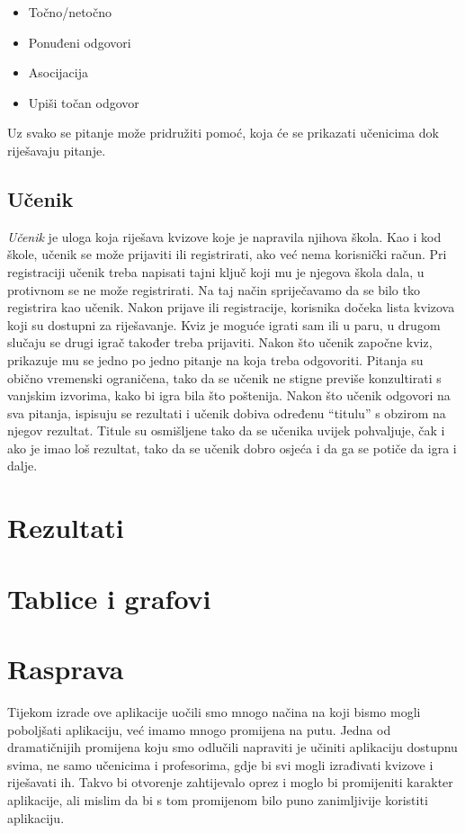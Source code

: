 \documentclass{scrreprt}
\begin{document}
\begin{itemize}
  \item Točno/netočno
  \item Ponuđeni odgovori
  \item Asocijacija
  \item Upiši točan odgovor
\end{itemize}

Uz svako se pitanje može pridružiti pomoć, koja će se prikazati učenicima dok
riješavaju pitanje.

\section{Učenik}

\emph{Učenik} je uloga koja riješava kvizove koje je napravila njihova škola.
Kao i kod škole, učenik se može prijaviti ili registrirati, ako već nema
korisnički račun. Pri registraciji učenik treba napisati tajni ključ koji mu je
njegova škola dala, u protivnom se ne može registrirati. Na taj način
spriječavamo da se bilo tko registrira kao učenik. Nakon prijave ili
registracije, korisnika dočeka lista kvizova koji su dostupni za riješavanje.
Kviz je moguće igrati sam ili u paru, u drugom slučaju se drugi igrač također
treba prijaviti. Nakon što učenik započne kviz, prikazuje mu se jedno po jedno
pitanje na koja treba odgovoriti. Pitanja su obično vremenski ograničena, tako
da se učenik ne stigne previše konzultirati s vanjskim izvorima, kako bi igra
bila što poštenija. Nakon što učenik odgovori na sva pitanja, ispisuju se
rezultati i učenik dobiva određenu ``titulu'' s obzirom na njegov rezultat.
Titule su osmišljene tako da se učenika uvijek pohvaljuje, čak i ako je imao loš
rezultat, tako da se učenik dobro osjeća i da ga se potiče da igra i dalje.

\chapter{Rezultati}

\chapter{Tablice i grafovi}

\chapter{Rasprava}

Tijekom izrade ove aplikacije uočili smo mnogo načina na koji bismo mogli
poboljšati aplikaciju, već imamo mnogo promijena na putu. Jedna od dramatičnijih
promijena koju smo odlučili napraviti je učiniti aplikaciju dostupnu svima, ne
samo učenicima i profesorima, gdje bi svi mogli izrađivati kvizove i riješavati
ih. Takvo bi otvorenje zahtijevalo oprez i moglo bi promijeniti karakter
aplikacije, ali mislim da bi s tom promijenom bilo puno zanimljivije koristiti
aplikaciju.
\end{document}
